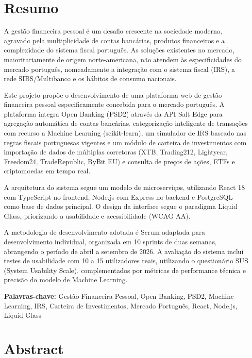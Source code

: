\chapter*{Resumo}

A gestão financeira pessoal é um desafio crescente na sociedade moderna, agravado pela multiplicidade de contas bancárias, produtos financeiros e a complexidade do sistema fiscal português. As soluções existentes no mercado, maioritariamente de origem norte-americana, não atendem às especificidades do mercado português, nomeadamente a integração com o sistema fiscal (IRS), a rede SIBS/Multibanco e os hábitos de consumo nacionais.

Este projeto propõe o desenvolvimento de uma plataforma web de gestão financeira pessoal especificamente concebida para o mercado português. A plataforma integra Open Banking (PSD2) através da API Salt Edge para agregação automática de contas bancárias, categorização inteligente de transações com recurso a Machine Learning (scikit-learn), um simulador de IRS baseado nas regras fiscais portuguesas vigentes e um módulo de carteira de investimentos com importação de dados de múltiplas corretoras (XTB, Trading212, Lightyear, Freedom24, TradeRepublic, ByBit EU) e consulta de preços de ações, ETFs e criptomoedas em tempo real.

A arquitetura do sistema segue um modelo de microserviços, utilizando React 18 com TypeScript no frontend, Node.js com Express no backend e PostgreSQL como base de dados principal. O design da interface segue o paradigma Liquid Glass, priorizando a usabilidade e acessibilidade (WCAG AA).

A metodologia de desenvolvimento adotada é Scrum adaptada para desenvolvimento individual, organizada em 10 sprints de duas semanas, abrangendo o período de abril a setembro de 2026. A avaliação do sistema inclui testes de usabilidade com 10 a 15 utilizadores reais, utilizando o questionário SUS (System Usability Scale), complementados por métricas de performance técnica e precisão do modelo de Machine Learning.

\vspace{0.5cm}
\noindent\textbf{Palavras-chave:} Gestão Financeira Pessoal, Open Banking, PSD2, Machine Learning, IRS, Carteira de Investimentos, Mercado Português, React, Node.js, Liquid Glass

\chapter*{Abstract}

